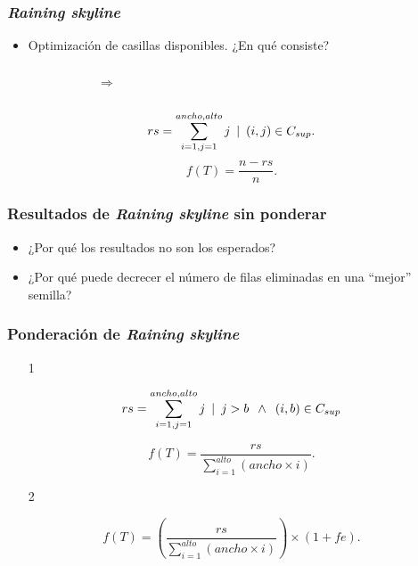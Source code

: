 \begin{frame}
\frametitle{\textit{Raining skyline}}
\begin{itemize}
\item Optimización de casillas disponibles. ¿En qué consiste?
\end{itemize}
\begin{columns}
\begin{figure}
\scalebox{.40}{}
\end{figure}
\pause
{}
\begin{center}
$\Longrightarrow$
\end{center}
\begin{figure}
\scalebox{.40}{}
\end{figure}
\end{columns}
\pause
\vspace{10mm}
\begin{displaymath}
  rs = \sum_{i=1,j=1}^{ancho, alto} j \enskip | \enskip (i,j) \in C_{sup}.
\end{displaymath} 
\hspace{10mm}
\begin{displaymath}
  f(T) = \frac{n - rs}{n}.
\end{displaymath} 
\end{frame}

\begin{frame}
\frametitle{Resultados de \textit{Raining skyline} sin ponderar}
\begin{figure}
\scalebox{.7}{}
\end{figure}
\pause
\begin{itemize}
\item ¿Por qué los resultados no son los esperados?
\item ¿Por qué puede decrecer el número de filas eliminadas en una ``mejor'' semilla?
\end{itemize}
\end{frame}

\begin{frame}
\frametitle{Ponderación de \textit{Raining skyline}}
\begin{itemize}
\item[1]
\end{itemize}
\begin{displaymath}
  rs = \sum_{i=1,j=1}^{ancho, alto} j \enskip | \enskip j > b \enskip \land \enskip (i,b) \in C_{sup} 
  \end{displaymath} 

  \begin{displaymath}
    f(T) = \frac{rs}{\sum\limits_{i=1}^{alto} (ancho \times i)}.
\end{displaymath} 
\pause
\begin{itemize}
\item[2]
\end{itemize}
 \begin{displaymath}
    f(T) = \left(\frac{rs}{\sum\limits_{i=1}^{alto} (ancho \times i)}\right) \times (1 + fe).
\end{displaymath} 
\end{frame}

